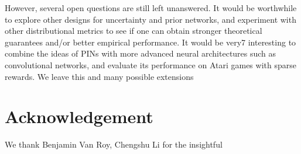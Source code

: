 \documentclass[letterpaper]{article} %
\theoremstyle{definition}
\begin{document}
However, several open questions are still left unanswered. It would be worthwhile to explore other designs for uncertainty and prior networks, and experiment with other distributional metrics to see if one can obtain stronger theoretical guarantees and/or better empirical performance. It would be very7 interesting to combine the ideas of PINs with more advanced neural architectures such as convolutional networks, and evaluate its performance on Atari games with sparse rewards. We leave this and many possible extensions

\section{Acknowledgement}
We thank Benjamin Van Roy, Chengshu Li for the insightful

\medskip

\clearpage


\end{document}
